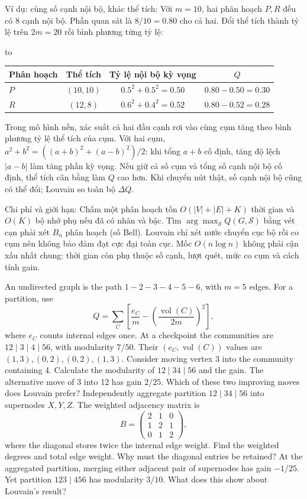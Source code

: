 \documentclass[10pt,a4paper,twocolumn]{article}
\newcommand{\key}[1]{#1:\enspace}
\newenvironment{examtable}[1]{%
  \par\addvspace{2pt}\noindent\hbox to \linewidth\bgroup\hfil
  \setlength{\tabcolsep}{4pt}%
  \renewcommand{\arraystretch}{1.12}\begin{tabular}{#1}%
}{\end{tabular}\hfil\egroup\par\addvspace{2pt}}
\begin{document}
\key{Ví dụ: cùng số cạnh nội bộ, khác thể tích} Với $m=10$, hai phân hoạch $P,R$ đều có 8 cạnh nội bộ. Phần quan sát là $8/10=0.80$ cho cả hai. Đổi thể tích thành tỷ lệ trên $2m=20$ rồi bình phương từng tỷ lệ:
\begin{examtable}{@{}lccc@{}}
\toprule
Phân hoạch & Thể tích & Tỷ lệ nội bộ kỳ vọng & $Q$ \\
\midrule
$P$ & $(10,10)$ & $0.5^2+0.5^2=0.50$ & $0.80-0.50=0.30$ \\
$R$ & $(12,8)$ & $0.6^2+0.4^2=0.52$ & $0.80-0.52=0.28$ \\
\bottomrule
\end{examtable}
Trong mô hình nền, xác suất cả hai đầu cạnh rơi vào cùng cụm tăng theo bình phương tỷ lệ thể tích của cụm. Với hai cụm, $a^2+b^2=((a+b)^2+(a-b)^2)/2$: khi tổng $a+b$ cố định, tăng độ lệch $|a-b|$ làm tăng phần kỳ vọng. Nếu giữ cả số cụm và tổng số cạnh nội bộ cố định, thể tích cân bằng làm $Q$ cao hơn. Khi chuyển nút thật, số cạnh nội bộ cũng có thể đổi; Louvain so toàn bộ $\Delta Q$.

\key{Chi phí và giới hạn} Chấm một phân hoạch tốn $O(|V|+|E|+K)$ thời gian và $O(K)$ bộ nhớ phụ nếu đã có nhãn và bậc. Tìm $\arg\max_{\mathcal S}Q(G,\mathcal S)$ bằng vét cạn phải xét $B_n$ phân hoạch (số Bell). Louvain chỉ xét nước chuyển cục bộ rồi co cụm nên không bảo đảm đạt cực đại toàn cục. Mốc $O(n\log n)$ không phải cận xấu nhất chung: thời gian còn phụ thuộc số cạnh, lượt quét, mức co cụm và cách tính gain.

An undirected graph is the path $1-2-3-4-5-6$, with $m=5$ edges. For a partition, use
\[
Q=\sum_C\left[\frac{e_C}{m}-\left(\frac{\operatorname{vol}(C)}{2m}\right)^2\right],
\]
where $e_C$ counts internal edges once. At a checkpoint the communities are $12\mid3\mid4\mid56$, with modularity $7/50$. Their $(e_C,\operatorname{vol}(C))$ values are $(1,3),(0,2),(0,2),(1,3)$.
 Consider moving vertex 3 into the community containing 4. Calculate the modularity of $12\mid34\mid56$ and the gain. The alternative move of 3 into 12 has gain $2/25$. Which of these two improving moves does Louvain prefer?
 Independently aggregate partition $12\mid34\mid56$ into supernodes $X,Y,Z$. The weighted adjacency matrix is
\[
B=\begin{pmatrix}2&1&0\\1&2&1\\0&1&2\end{pmatrix},
\]
where the diagonal stores twice the internal edge weight. Find the weighted degrees and total edge weight. Why must the diagonal entries be retained?
 At the aggregated partition, merging either adjacent pair of supernodes has gain $-1/25$. Yet partition $123\mid456$ has modularity $3/10$. What does this show about Louvain's result?
\end{document}
